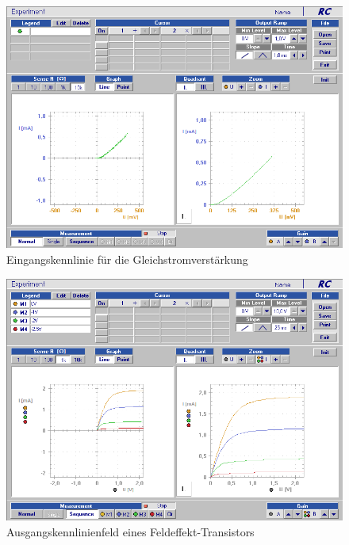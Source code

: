 \documentclass[12pt,a4paper]{article}
\begin{document}
\begin{figure}[H]
	\centering
	\includegraphics[scale=0.45]{./data/Braun_Kurz_PS8/Gleichstromverstaerkung.png}
	\caption{Eingangskennlinie für die Gleichstromverstärkung}
	\label{fig:eingangsskennlinien}
\end{figure}

\begin{figure}[H]
	\centering
	\includegraphics[scale=0.45]{./data/Braun_Kurz_PS8/FET_Ausgangskennlinien.png}
	\caption{Ausgangskennlinienfeld eines Feldeffekt-Transistors}
	\label{fig:ausgangskennlinienfeld_fet}
\end{figure}
\end{document}
